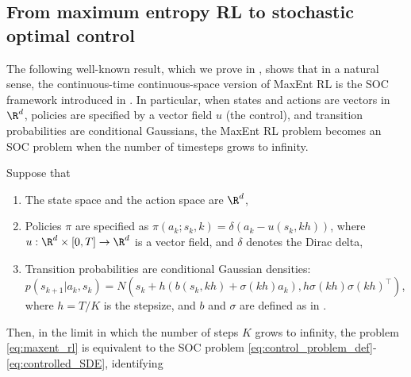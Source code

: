 \subsection{From maximum entropy RL to stochastic optimal control}
The following well-known result, which we prove in , shows that in a natural sense, the continuous-time continuous-space version of MaxEnt RL is the SOC
framework introduced in . In particular, when states and actions are vectors in $\R^d$, policies are specified by a vector field $u$ (the control), and transition probabilities are conditional Gaussians, the MaxEnt RL problem becomes an SOC problem when the number of timesteps grows to infinity. 

\begin{proposition} \label{prop:max_ent_stochastic_optimal_control}
    Suppose that 
    \begin{enumerate}[label=(\roman*)]
    \item The state space and the action space are 
    $\R^d$,
    \item Policies $\pi$ are specified as $\pi(a_k;s_k,k) = \delta(a_k - u(s_k,kh))$, where $u : \R^d \times [0,T] \to \R^d$ is a vector field, and $\delta$ denotes the Dirac delta, 
    \item 
    Transition probabilities are conditional Gaussian densities: $p(s_{k+1}|a_k,s_k) = N(s_k + h (b(s_k,kh) + \sigma(kh) a_k), h 
    \sigma(kh)\sigma(kh)^{\top})$, where $h  = T/K$ is the stepsize, and $b$ and $\sigma$ are defined as in . 
    \end{enumerate}
    Then, in the limit in which the number of steps $K$ grows to infinity, the problem \eqref{eq:maxent_rl} is equivalent to the SOC
    problem \eqref{eq:control_problem_def}-\eqref{eq:controlled_SDE}, identifying
    \begin{itemize}

\end{itemize}
\end{proposition}
